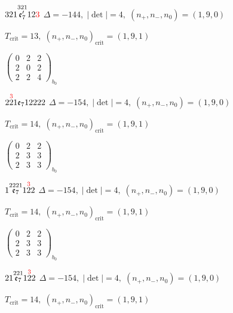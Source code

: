 \documentclass[10pt]{article}
\begin{document}
$321\overset{321}{\mathfrak{e}_7'}12\textcolor{red}{3}$ \quad $\Delta=-144,\; |\det|=4,\; (n_+,n_-,n_0)=(1,9,0)$

\hspace{1em}$T_{\text{crit}}=13,\; (n_+,n_-,n_0)_{\text{crit}}=(1,9,1)$

\hspace{2em}$\left(\begin{smallmatrix}0 & 2 & 2 \\ 2 & 0 & 2 \\ 2 & 2 & 4\end{smallmatrix}\right)_{\!b_0}$

\smallskip

$2\overset{\textcolor{red}{3}}{2}1\mathfrak{e}_712222$ \quad $\Delta=-154,\; |\det|=4,\; (n_+,n_-,n_0)=(1,9,0)$

\hspace{1em}$T_{\text{crit}}=14,\; (n_+,n_-,n_0)_{\text{crit}}=(1,9,1)$

\hspace{2em}$\left(\begin{smallmatrix}0 & 2 & 2 \\ 2 & 3 & 3 \\ 2 & 3 & 3\end{smallmatrix}\right)_{\!b_0}$

\smallskip

$1\overset{2221}{\mathfrak{e}_7}1\overset{\textcolor{red}{3}}{2}2$ \quad $\Delta=-154,\; |\det|=4,\; (n_+,n_-,n_0)=(1,9,0)$

\hspace{1em}$T_{\text{crit}}=14,\; (n_+,n_-,n_0)_{\text{crit}}=(1,9,1)$

\hspace{2em}$\left(\begin{smallmatrix}0 & 2 & 2 \\ 2 & 3 & 3 \\ 2 & 3 & 3\end{smallmatrix}\right)_{\!b_0}$

\smallskip

$21\overset{221}{\mathfrak{e}_7}1\overset{\textcolor{red}{3}}{2}2$ \quad $\Delta=-154,\; |\det|=4,\; (n_+,n_-,n_0)=(1,9,0)$

\hspace{1em}$T_{\text{crit}}=14,\; (n_+,n_-,n_0)_{\text{crit}}=(1,9,1)$
\end{document}
